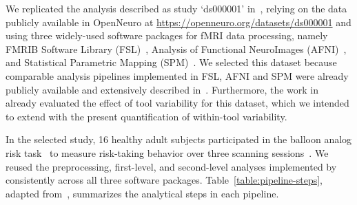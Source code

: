 \documentclass[11pt,onecolumn]{article}
\begin{document}
We replicated the analysis described as study `ds000001'
in~\cite{schonberg2012decreasing}, relying on the data publicly available
in OpenNeuro at \url{https://openneuro.org/datasets/ds000001} and using
three widely-used software packages for fMRI data processing, namely FMRIB
Software Library (FSL)~\cite{jenkinson2012fsl}, Analysis of Functional
NeuroImages (AFNI)~\cite{cox1996afni}, and Statistical Parametric
Mapping (SPM)~\cite{penny2011statistical}. We selected this dataset because
comparable analysis pipelines implemented in FSL, AFNI and SPM were already
publicly available and extensively described in~\cite{bowring2019exploring}.
Furthermore, the work in~\cite{bowring2019exploring} already evaluated the
effect of tool variability for this dataset, which we intended to
extend with the present quantification of within-tool variability.

In the selected study, 16 healthy adult subjects participated in the
balloon analog risk task~\cite{lejuez2002evaluation} to measure risk-taking
behavior over three scanning sessions~\cite{schonberg2012decreasing}. We
reused the preprocessing, first-level, and second-level analyses
implemented by~\cite{bowring2019exploring} consistently across all three
software packages. Table~\ref{table:pipeline-steps}, adapted from~\cite{bowring2019exploring},
summarizes the analytical steps in each
pipeline.
\end{document}
